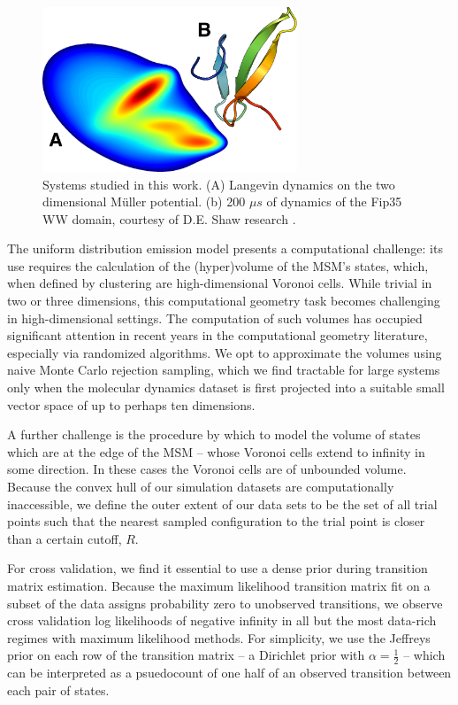 \documentclass[twocolumn,floatfix,nofootinbib,aps]{revtex4-1}
\begin{document}
\begin{figure}
\centering
\includegraphics[width=3in]{figs_final/mull_ww.png}
\caption{Systems studied in this work. (A) Langevin dynamics on the two dimensional M\"{u}ller potential. (b) 200 $\mu s$ of dynamics of the Fip35 WW domain\cite{Liu2008Experimental}, courtesy of D.E. Shaw research \cite{Shaw2010Atomic}.}
\end{figure}

The uniform distribution emission model presents a computational challenge: its use requires the calculation of the (hyper)volume of the MSM's states, which, when defined by clustering are high-dimensional Voronoi cells. While trivial in two or three dimensions, this computational geometry task becomes challenging in high-dimensional settings. The computation of such volumes has occupied significant attention in recent years in the computational geometry literature, especially via randomized algorithms\cite{Kannan97, Simonovits03, Lovasz03}. We opt to approximate the volumes using naive Monte Carlo rejection sampling, which we find tractable for large systems only when the molecular dynamics dataset is first projected into a suitable small vector space of up to perhaps ten dimensions.

A further challenge is the procedure by which to model the volume of states which are at the edge of the MSM -- whose Voronoi cells extend to infinity in some direction. In these cases the Voronoi cells are of unbounded volume. Because the convex hull of our simulation datasets are computationally inaccessible, we define the outer extent of our data sets to be the set of all trial points such that the nearest sampled configuration to the trial point is closer than a certain cutoff, $R$.

For cross validation, we find it essential to use a dense prior during transition matrix estimation. Because the maximum likelihood transition matrix fit on a subset of the data assigns probability zero to unobserved transitions, we observe cross validation log likelihoods of negative infinity in all but the most data-rich regimes with maximum likelihood methods. For simplicity, we use the Jeffreys prior on each row of the transition matrix -- a Dirichlet prior with $\alpha=\frac{1}{2}$ -- which can be interpreted as a psuedocount of one half of an observed transition between each pair of states.
\end{document}
